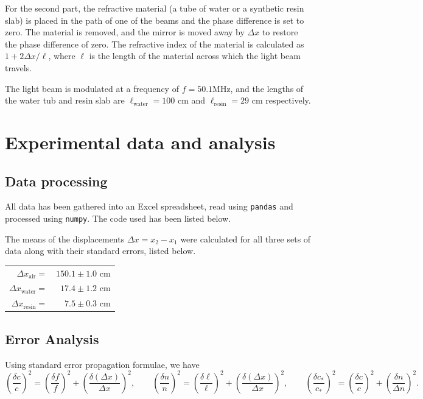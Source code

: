 \documentclass[11pt]{article}
\begin{document}
        For the second part, the refractive material (a tube of water or a synthetic resin slab) is placed in the path of one of the beams
        and the phase difference is set to zero. The material is removed, and the mirror is moved away by $\Delta x$ to restore the phase
        difference of zero. The refractive index of the material is calculated as $1 + 2\Delta x / \ell$, where $\ell$ is the length of the
        material across which the light beam travels.

        The light beam is modulated at a frequency of $f = 50.1$MHz, and the lengths of the water tub and resin slab are $\ell_\text{water} = 100$ cm and 
        $\ell_\text{resin} = 29$ cm respectively.
        
        \section{Experimental data and analysis}
        
        \subsection{Data processing}
        
        All data has been gathered into an Excel spreadsheet, read using \texttt{pandas} and processed using \texttt{numpy}.
        The code used has been listed below.

        

        The means of the displacements $\Delta x = x_2 - x_1$ were calculated for all three sets of data along with their standard errors, listed
        below.
        \begin{center}
        \begin{tabular}{rr}
                $\Delta x_\text{air} =$ & $150.1 \pm 1.0$ cm \\
                $\Delta x_\text{water} =$ & $17.4 \pm 1.2$ cm \\
                $\Delta x_\text{resin} =$ & $7.5 \pm 0.3$ cm \\
        \end{tabular}
        \end{center}

        \subsection{Error Analysis}
        Using standard error propagation formulae, we have
        \[
                \left(\frac{\delta c}{c}\right)^2 = \left( \frac{\delta f}{f} \right)^2 + \left( \frac{\delta(\Delta x)}{\Delta x} \right)^2, \qquad
                \left(\frac{\delta n}{n}\right)^2 = \left( \frac{\delta \ell}{\ell} \right)^2 + \left( \frac{\delta(\Delta x)}{\Delta x} \right)^2, \qquad
                \left(\frac{\delta c_*}{c_*}\right)^2 = \left( \frac{\delta c}{c} \right)^2 + \left( \frac{\delta n}{\Delta n} \right)^2.
        \]
\end{document}
